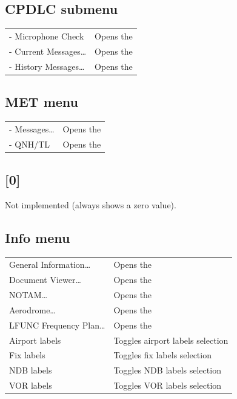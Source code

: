 \documentclass[a4paper,oneside,11pt]{memoir}
\newcommand{\winref}[1]{\textit{\titleref{#1}}}
\begin{document}
\subsection*{CPDLC submenu}
\label{menu:cpdlc}

\begin{longtable}{p{5cm} p{7.5cm}}
- Microphone Check      & Opens the \winref{menu:dlmcm}\\
- Current Messages…   & Opens the \winref{win:dlcmw}\\
- History Messages…   & Opens the \winref{win:dlhmw}\\
\end{longtable}

\subsection{MET menu}
\label{menu:met}

\begin{longtable}{p{5cm} p{7.5cm}}
- Messages… & Opens the \winref{win:wxmw}\\
- QNH/TL    & Opens the \winref{win:qnhtl}\\
\end{longtable}

\subsection{[0]}

Not implemented (always shows a zero value).

\subsection{Info menu}
\label{menu:info}

\begin{longtable}{p{5cm} p{7.5cm}}
  General Information…      & Opens the \winref{win:geninfo}\\
  Document Viewer…          & Opens the \winref{win:dvw}\\
  NOTAM…                    & Opens the \winref{win:notamlw}\\
  Aerodrome…                & Opens the \winref{menu:ad}\\
  LFUNC Frequency Plan…     & Opens the \winref{win:lfunc}\\
  Airport labels            & Toggles airport labels selection\\
  Fix labels                & Toggles fix labels selection\\
  NDB labels                & Toggles NDB labels selection\\
  VOR labels                & Toggles VOR labels selection\\
\end{longtable}
\end{document}
